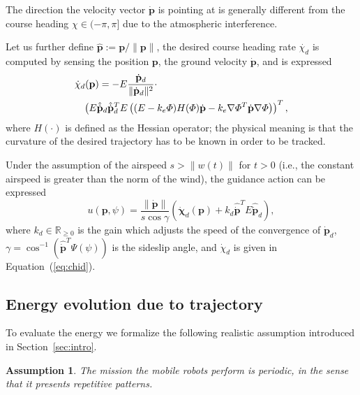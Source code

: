 \documentclass[letterpaper,10pt,conference]{ieeeconf}
\newtheorem{assm}[thm]{Assumption}
\begin{document}
The direction the velocity vector $\dot{\mathbf{p}}$ is pointing at is generally different from the course heading $\chi\in(-\pi,\pi]$ due to the atmospheric interference.

Let us further define $\hat{\mathbf{p}}:=\mathbf{p}/\|\mathbf{p}\|$, the desired course heading rate $\dot{\chi_d}$ is computed by sensing the position $\mathbf{p}$, the ground velocity $\dot{\mathbf{p}}$, and is expressed
\begin{equation}\label{eq:chid}\begin{split}
  &\dot{\chi}_d(\mathbf{p})=-E\frac{\dot{\mathbf{p}}_d}{\|\dot{\mathbf{p}}_d\|^2}\cdot\\
  &\hspace{2ex}\left( E\hat{\dot{\mathbf{p}}}_d\hat{\dot{\mathbf{p}}}_d^TE\left( (E-k_e\varPhi)H(\varPhi)\dot{\mathbf{p}}-k_e\nabla\varPhi^T\dot{\mathbf{p}}\nabla\varPhi \right) \right)^T,
\end{split}
\end{equation} 
where $H(\cdot)$ is defined as the Hessian operator; the physical meaning is that the curvature of the desired trajectory has to be known in order to be tracked.

Under the assumption of the airspeed $s>\|w(t)\|$ for $t>0$ (i.e., the constant airspeed is greater than the norm of the wind), the guidance action can be expressed
\begin{equation}\label{eq:uav-cont}
  u(\mathbf{p},\psi)=\frac{\|\dot{\mathbf{p}}\|}{s\cos{\gamma}}\left( \dot{\mathbf{\chi}}_d(\mathbf{p})+k_d\hat{\dot{\mathbf{p}}}^TE\hat{\dot{\mathbf{p}}}_d \right),
\end{equation} 
where $k_d\in\mathbb{R}_{\geq 0}$ is the gain which adjusts the speed of the convergence of $\dot{\mathbf{p}}_d$, $\gamma=\cos^{-1}{\left( \hat{\dot{\mathbf{p}}}^T\Psi(\psi) \right)}$ is the sideslip angle, and $\dot{\chi}_d$ is given in Equation~(\ref{eq:chid}).

\subsection{Energy evolution due to trajectory}
\label{sec:energy-model}

To evaluate the energy we formalize the following realistic assumption introduced in Section~\ref{sec:intro}.
\begin{assm}\label{assm:periodic}
The mission the mobile robots perform is periodic, in the sense that it presents repetitive patterns.
\end{assm}
\end{document}
